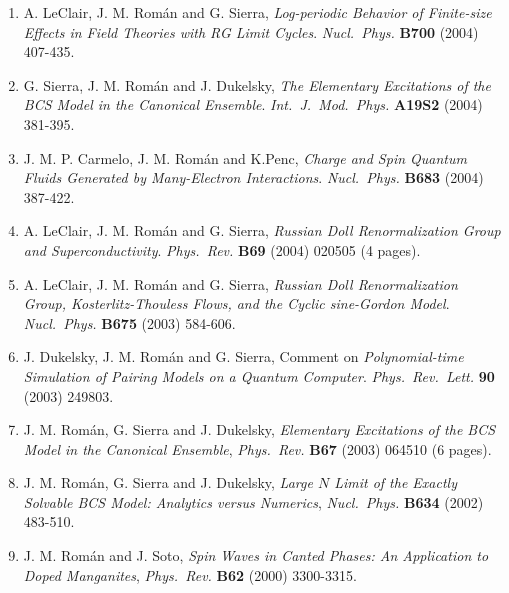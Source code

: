 \documentclass{article}
\begin{document}
\begin{enumerate}
\item A. LeClair, J. M. Rom\'an and G. Sierra,
{\it Log-periodic Behavior of Finite-size Effects in Field Theories with RG Limit Cycles}.
{\it Nucl.~Phys.} {\bf B700} (2004) 407-435.

\item G. Sierra, J. M. Rom\'an and J. Dukelsky, 
{\it The Elementary Excitations of the BCS Model in the Canonical Ensemble}.
{\it Int.~J.~Mod.~Phys.} {\bf A19S2} (2004) 381-395.

\item J. M. P. Carmelo, J. M. Rom\'{a}n and K.Penc,
{\it Charge and Spin Quantum Fluids Generated by Many-Electron Interactions}.
{\it Nucl.~Phys.} {\bf B683} (2004) 387-422.

\item A. LeClair, J. M. Rom\'{a}n and G. Sierra, 
{\it Russian Doll Renormalization Group and Superconductivity}. 
{\it Phys.~Rev.} {\bf B69} (2004) 020505 (4 pages).

\item A. LeClair, J. M. Rom\'{a}n and G. Sierra, 
{\it Russian Doll Renormalization Group, Kosterlitz-Thouless Flows, 
and the Cyclic sine-Gordon Model}. 
{\it Nucl.~Phys.} {\bf B675} (2003) 584-606.

\item J. Dukelsky, J. M. Rom\'an and G. Sierra,
Comment on {\it Polynomial-time Simulation of Pairing Models 
on a Quantum Computer}.
{\it Phys.~Rev.~Lett.} {\bf 90} (2003) 249803.

\item J. M. Rom\'an, G. Sierra and J. Dukelsky, 
{\it Elementary Excitations of the BCS Model in the Canonical Ensemble},
{\it Phys.~Rev.} {\bf B67} (2003) 064510 (6 pages).

\item J. M. Rom\'an, G. Sierra and J. Dukelsky, 
{\it Large $N$ Limit of the Exactly Solvable BCS Model: 
Analytics versus Numerics},
{\it Nucl.~Phys.} {\bf B634} (2002) 483-510.

\item J. M. Rom\'an and J. Soto, 
{\it Spin Waves in Canted Phases: An Application to Doped Manganites}, 
{\it Phys.~Rev.} {\bf B62} (2000) 3300-3315.


\end{enumerate}
\end{document}
